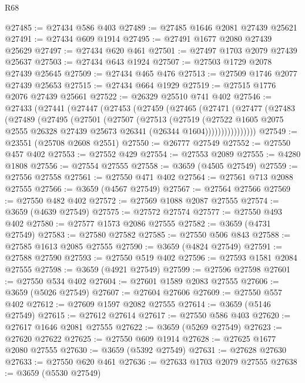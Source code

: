 \begin{lexlean}{R68}
\begin{coremodule}
@27485 := @27434 @586 @403
@27489 := @27485 @1646 @2081 @27439 @25621
@27491 := @27434 @609 @1914
@27495 := @27491 @1677 @2080 @27439 @25629
@27497 := @27434 @620 @461
@27501 := @27497 @1703 @2079 @27439 @25637
@27503 := @27434 @643 @1924
@27507 := @27503 @1729 @2078 @27439 @25645
@27509 := @27434 @465 @476
@27513 := @27509 @1746 @2077 @27439 @25653
@27515 := @27434 @664 @1929
@27519 := @27515 @1776 @2076 @27439 @25661
@27522 := @26329 @25510 @741 @402
@27546 := @27433
    (@27441
      (@27447
        (@27453
          (@27459
            (@27465
              (@27471
                (@27477
                  (@27483
                    (@27489
                      (@27495
                        (@27501
                          (@27507
                            (@27513
                              (@27519
                                (@27522
                                  @1605
                                  @2075
                                  @2555
                                  @26328
                                  @27439
                                  @25673
                                  @26341
                                  (@26344 @1604))))))))))))))))
@27549 := @23551 (@25708 @2608 @2551)
@27550 := @26777 @27549
@27552 := @27550 @457 @402
@27553 := @27552 @429
@27554 := @27553 @2089
@27555 := @4280 @1808
@27556 := @27554 @27555
@27558 := @3659 (@4505 @27549)
@27559 := @27556 @27558
@27561 := @27550 @471 @402
@27564 := @27561 @713 @2088 @27555
@27566 := @3659 (@4567 @27549)
@27567 := @27564 @27566
@27569 := @27550 @482 @402
@27572 := @27569 @1088 @2087 @27555
@27574 := @3659 (@4639 @27549)
@27575 := @27572 @27574
@27577 := @27550 @493 @402
@27580 := @27577 @1573 @2086 @27555
@27582 := @3659 (@4731 @27549)
@27583 := @27580 @27582
@27585 := @27550 @506 @843
@27588 := @27585 @1613 @2085 @27555
@27590 := @3659 (@4824 @27549)
@27591 := @27588 @27590
@27593 := @27550 @519 @402
@27596 := @27593 @1581 @2084 @27555
@27598 := @3659 (@4921 @27549)
@27599 := @27596 @27598
@27601 := @27550 @534 @402
@27604 := @27601 @1589 @2083 @27555
@27606 := @3659 (@5026 @27549)
@27607 := @27604 @27606
@27609 := @27550 @557 @402
@27612 := @27609 @1597 @2082 @27555
@27614 := @3659 (@5146 @27549)
@27615 := @27612 @27614
@27617 := @27550 @586 @403
@27620 := @27617 @1646 @2081 @27555
@27622 := @3659 (@5269 @27549)
@27623 := @27620 @27622
@27625 := @27550 @609 @1914
@27628 := @27625 @1677 @2080 @27555
@27630 := @3659 (@5392 @27549)
@27631 := @27628 @27630
@27633 := @27550 @620 @461
@27636 := @27633 @1703 @2079 @27555
@27638 := @3659 (@5530 @27549)

\end{coremodule}
\end{lexlean}
